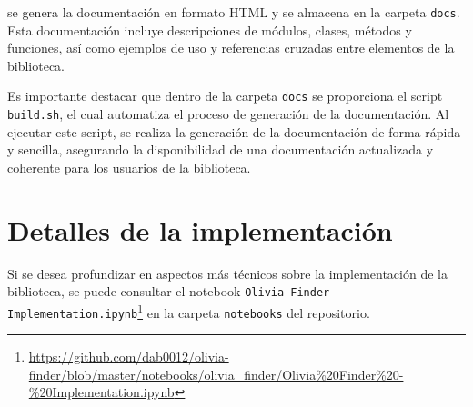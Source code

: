 se genera la documentación en formato HTML y se almacena en la 
carpeta \texttt{docs}. Esta documentación incluye descripciones de módulos, clases, métodos y funciones,
 así como ejemplos de uso y referencias cruzadas entre elementos de la biblioteca.

Es importante destacar que dentro de la carpeta \texttt{docs} se proporciona el script \texttt{build.sh}, 
el cual automatiza el proceso de generación de la documentación. Al ejecutar este script, se realiza la 
generación de la documentación de forma rápida y sencilla, asegurando la disponibilidad de una documentación 
actualizada y coherente para los usuarios de la biblioteca.


\section{Detalles de la implementación}

Si se desea profundizar en aspectos más técnicos sobre la implementación de la biblioteca, se puede consultar 
el notebook \texttt{Olivia Finder - Implementation.ipynb}\footnote{\url{https://github.com/dab0012/olivia-finder/blob/master/notebooks/olivia_finder/Olivia\%20Finder\%20-\%20Implementation.ipynb}}
 en la carpeta \texttt{notebooks} del repositorio.
